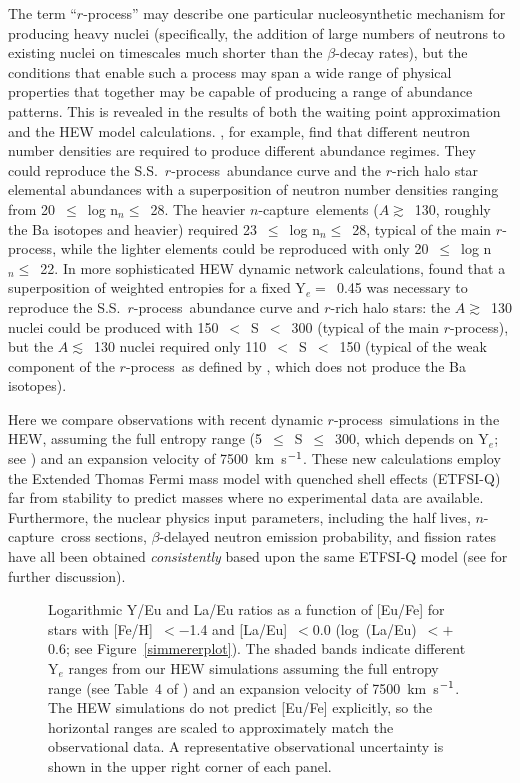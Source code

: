 \documentclass{emulateapj}
\def\kmsec{\mbox{km~s$^{\rm -1}$}}
\def\rpro{\mbox{$r$-process}}
\def\ncap{\mbox{$n$-capture}}
\begin{document}
The term ``\rpro'' may describe one particular nucleosynthetic 
mechanism for producing heavy nuclei (specifically, the 
addition of large numbers of neutrons to existing nuclei
on timescales much shorter than the $\beta$-decay rates), but 
the conditions that enable such a process may 
span a wide range of physical properties that
together may be capable of producing a range of abundance patterns.
This is revealed in the results of both the waiting point approximation 
and the HEW model calculations. 
\citet{kratz07}, for example, find that different neutron number densities 
are required to produce different abundance regimes. 
They could reproduce the S.S.\ \rpro\ abundance curve
and the $r$-rich halo star elemental abundances with a superposition of 
neutron number densities ranging from 
20~$\leq$~log n$_n \leq$~28. 
The heavier \ncap\ elements ($A \gtrsim$~130, roughly the Ba isotopes
and heavier)
required 23~$\leq$~log n$_n \leq$~28, typical of
the main \rpro, while the lighter elements could be reproduced
with only 20~$\leq$~log n$_n \leq$~22.
In more sophisticated HEW dynamic network calculations,
\citet{farouqi09} found that a superposition of weighted
entropies for a fixed Y$_e =$~0.45
was necessary to reproduce the S.S.\ \rpro\ abundance curve
and $r$-rich halo stars:
the $A \gtrsim$~130 nuclei could be produced with 150~$<$~S~$<$~300
(typical of the main \rpro), but the $A \lesssim$~130 nuclei
required only 110~$<$~S~$<$~150 (typical of the weak 
component of the \rpro\ as defined by \citealt{pfeiffer01,truran02}, 
which does not produce the Ba isotopes).

Here we compare observations with 
recent dynamic \rpro\ simulations in the HEW,
assuming the full entropy range
(5~$\leq$~S~$\leq$~300, which depends on Y$_e$; see \citealt{farouqi10}) 
and an expansion velocity of 7500~\kmsec.
These new calculations employ the Extended Thomas Fermi 
mass model with quenched shell effects (ETFSI-Q) far 
from stability to predict masses where no experimental data are
available.  
Furthermore,  
the nuclear physics input parameters,   
including the half lives, \ncap\ cross sections,
$\beta$-delayed neutron emission probability,
and fission rates have all been obtained {\it consistently} based upon the 
same ETFSI-Q model (see \citealt{farouqi10} for further discussion).  

\begin{figure}
\begin{center}
\end{center}
\caption{
\label{hewplot}
Logarithmic Y/Eu and La/Eu ratios as a function of [Eu/Fe] for 
stars with [Fe/H]~$< -$1.4 and 
[La/Eu]~$< 0.0$ (log~(La/Eu)~$< +$0.6; see Figure~\ref{simmererplot}).
The shaded bands indicate different Y$_e$ ranges from our HEW simulations
assuming the full entropy range (see Table~4 of \citealt{farouqi10}) 
and an expansion velocity of 7500~\kmsec.
The HEW simulations do not predict [Eu/Fe] explicitly, so the horizontal
ranges are scaled to approximately match the observational data.
A representative observational uncertainty is shown 
in the upper right corner of each panel.
}
\end{figure}
\end{document}
